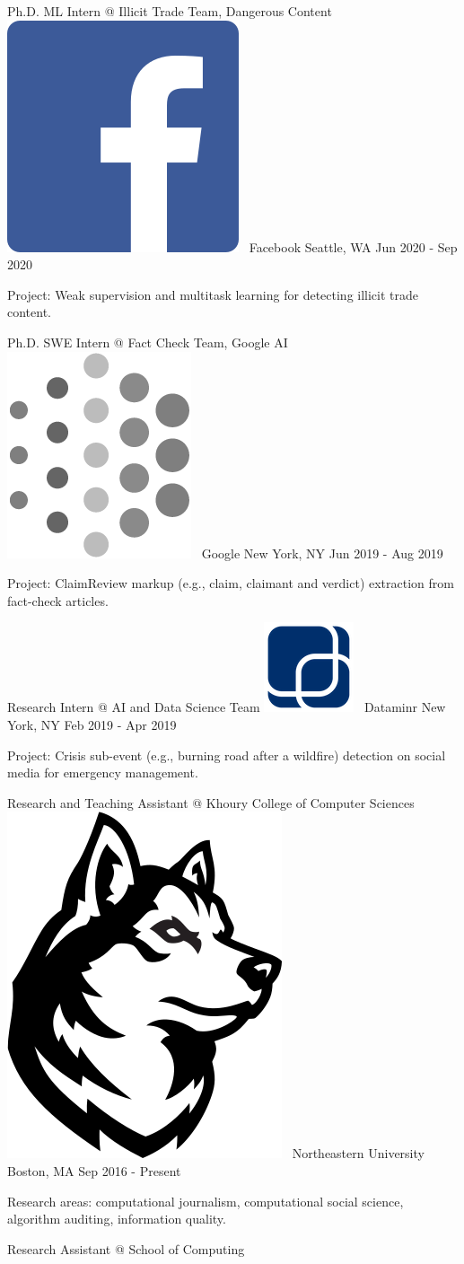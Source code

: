 \documentclass[letterpaper]{awesome-cv}
\begin{document}
\addvspace{0.5ex}
\begin{cventries}
  \cventry
    {Ph.D. ML Intern @ Illicit Trade Team, Dangerous Content}
    {\includegraphics[height=0.016\textwidth]{../images/logos/facebook.png}~ Facebook}
    {Seattle, WA}
    {Jun 2020 - Sep 2020}
    {
      \begin{cvitems}
        \item {Project: Weak supervision and multitask learning for detecting illicit trade content.}
      \end{cvitems}
    }
  \cventry
    {Ph.D. SWE Intern @ Fact Check Team, Google AI}
    {\includegraphics[height=0.017\textwidth]{../images/logos/google_ai.png}~ Google}
    {New York, NY}
    {Jun 2019 - Aug 2019}
    {
      \begin{cvitems}
        \item {Project: ClaimReview markup (e.g., claim, claimant and verdict) extraction from fact-check articles.}
      \end{cvitems}
    }
  \cventry
    {Research Intern @ AI and Data Science Team}
    {\includegraphics[height=0.017\textwidth]{../images/logos/dataminr.png}~ Dataminr}
    {New York, NY}
    {Feb 2019 - Apr 2019}
    {
      \begin{cvitems}
        \item {Project: Crisis sub-event (e.g., burning road after a wildfire) detection on social media for emergency management.}
      \end{cvitems}
    }
  \cventry
    {Research and Teaching Assistant @ Khoury College of Computer Sciences}
    {\includegraphics[height=0.02\textwidth]{../images/logos/northeastern.png}~ Northeastern University}
    {Boston, MA}
    {Sep 2016 - Present}
    {
      \begin{cvitems}
        \item {Research areas: computational journalism, computational social science, algorithm auditing, information quality.}
      \end{cvitems}
    }
  \cventry
    {Research Assistant @ School of Computing}

\end{cventries}
\end{document}
